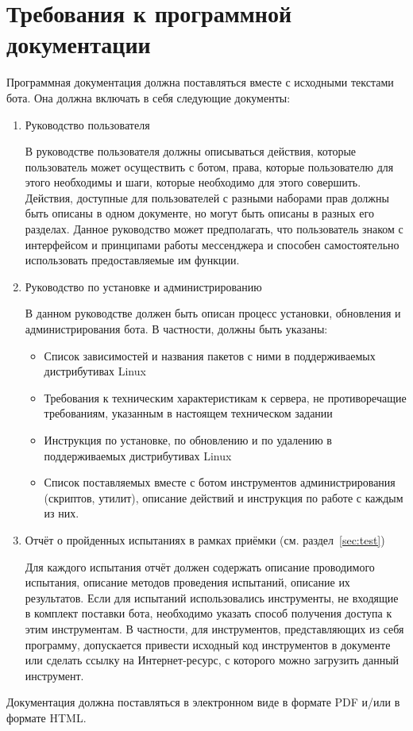 \section{Требования к программной документации}
\label{sec:doc}
Программная документация должна поставляться вместе с исходными текстами бота.
Она должна включать в себя следующие документы:

\begin{enumerate}
    \item
        Руководство пользователя
        
        В руководстве пользователя должны описываться действия, которые пользователь может
        осуществить с ботом, права, которые пользователю для этого необходимы и шаги,
        которые необходимо для этого совершить. Действия, доступные для пользователей
        с разными наборами прав должны быть описаны в одном документе, но могут быть описаны
        в разных его разделах. Данное руководство может предполагать, что пользователь знаком
        с интерфейсом и принципами работы мессенджера и способен самостоятельно использовать
        предоставляемые им функции.

    \item
        Руководство по установке и администрированию

        В данном руководстве должен быть описан процесс установки, обновления и администрирования бота.
        В частности, должны быть указаны:
        \begin{itemize}
            \item
                Список зависимостей и названия пакетов с ними в поддерживаемых дистрибутивах Linux
            \item
                Требования к техническим характеристикам к сервера, не противоречащие требованиям,
                указанным в настоящем техническом задании
            \item
                Инструкция по установке, по обновлению и по удалению в поддерживаемых дистрибутивах Linux
            \item
                Список поставляемых вместе с ботом инструментов администрирования (скриптов, утилит),
                описание действий и инструкция по работе с каждым из них.
        \end{itemize}

    \item
        Отчёт о пройденных испытаниях в рамках приёмки (см. раздел~\ref{sec:test})

        Для каждого испытания отчёт должен содержать описание проводимого испытания,
        описание методов проведения испытаний, описание их результатов.
        Если для испытаний использовались инструменты, не входящие в комплект поставки
        бота, необходимо указать способ получения доступа к этим инструментам. В частности,
        для инструментов, представляющих из себя программу,
        допускается привести исходный код инструментов в документе или сделать ссылку на
        Интернет-ресурс, с которого можно загрузить данный инструмент.
\end{enumerate}

Документация должна поставляться в электронном виде в формате PDF и/или в формате HTML.

